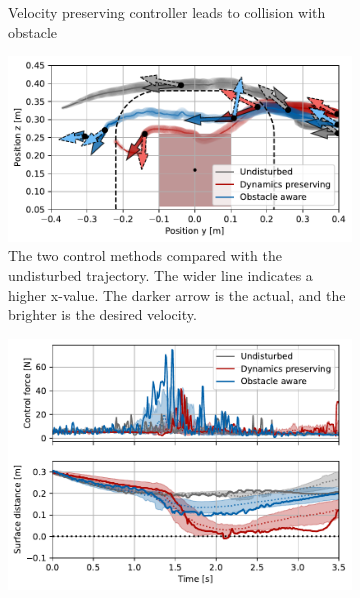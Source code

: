\begin{figure}
\begin{subfigure}{\columnwidth}
      \caption{Velocity preserving controller leads to collision with obstacle}
      \label{fig:franka_sequence_obstacle_aware}
    \end{subfigure}
    \begin{subfigure}{\columnwidth}
      \centerline{\includegraphics[width=\textwidth]{figures/robot_arm_trajectory_xyz}}
      \caption{The two control methods compared with the undisturbed trajectory. The wider line indicates a higher x-value. The darker arrow is the actual, and the brighter is the desired velocity.}
      \label{fig:robot_arm_trajectory_xyz}
    \end{subfigure}
    \begin{subfigure}{\columnwidth}
		\includegraphics[width=\textwidth]{figures/trajectory_comparison_force_and_distance}

\end{subfigure}
\end{figure}

